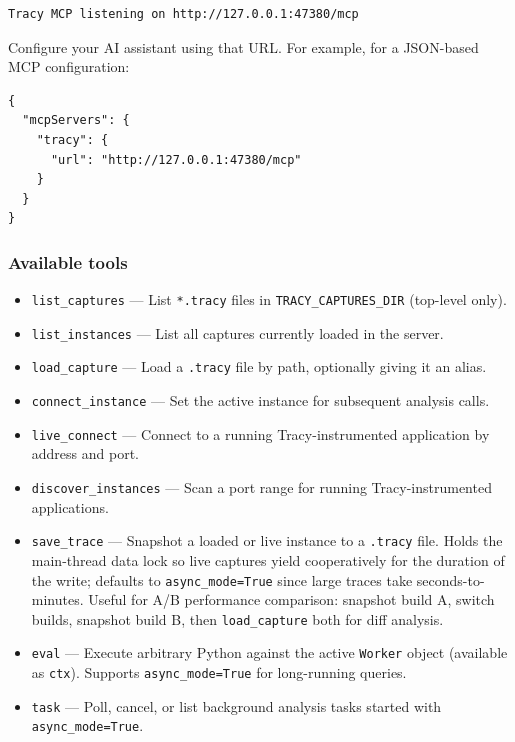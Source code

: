 \documentclass[hidelinks,titlepage,a4paper,twoside]{article}
\begin{document}
\begin{lstlisting}
Tracy MCP listening on http://127.0.0.1:47380/mcp
\end{lstlisting}

Configure your AI assistant using that URL. For example, for a JSON-based MCP configuration:

\begin{lstlisting}
{
  "mcpServers": {
    "tracy": {
      "url": "http://127.0.0.1:47380/mcp"
    }
  }
}
\end{lstlisting}

\subsubsection{Available tools}

\begin{itemize}
\item \texttt{list\_captures} --- List \texttt{*.tracy} files in \texttt{TRACY\_CAPTURES\_DIR} (top-level only).
\item \texttt{list\_instances} --- List all captures currently loaded in the server.
\item \texttt{load\_capture} --- Load a \texttt{.tracy} file by path, optionally giving it an alias.
\item \texttt{connect\_instance} --- Set the active instance for subsequent analysis calls.
\item \texttt{live\_connect} --- Connect to a running Tracy-instrumented application by address and port.
\item \texttt{discover\_instances} --- Scan a port range for running Tracy-instrumented applications.
\item \texttt{save\_trace} --- Snapshot a loaded or live instance to a \texttt{.tracy} file. Holds the main-thread data lock so live captures yield cooperatively for the duration of the write; defaults to \texttt{async\_mode=True} since large traces take seconds-to-minutes. Useful for A/B performance comparison: snapshot build A, switch builds, snapshot build B, then \texttt{load\_capture} both for diff analysis.
\item \texttt{eval} --- Execute arbitrary Python against the active \texttt{Worker} object (available as \texttt{ctx}). Supports \texttt{async\_mode=True} for long-running queries.
\item \texttt{task} --- Poll, cancel, or list background analysis tasks started with \texttt{async\_mode=True}.
\end{itemize}
\end{document}
